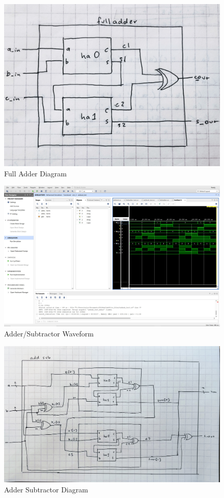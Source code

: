 \documentclass[11pt]{article}
\begin{document}
\begin{figure}[ht]\centering
	\includegraphics[width=\textwidth]{fulladder_diagram}
	\caption{Full Adder Diagram}
	\label{fig:fa_diagram}			
\end{figure}

\begin{figure}[ht] \includegraphics[width=1\textwidth,trim=19cm 14cm 0cm 6cm,clip]{addsub_screen}
	\caption{Adder/Subtractor Waveform}
	\label{fig:addsub_scrn}
\end{figure}

\begin{figure}[ht]\centering
	\includegraphics[width=\textwidth]{addsub_diagram}
	\caption{Adder Subtractor Diagram}
	\label{fig:as_diagram}			
\end{figure}
\end{document}
